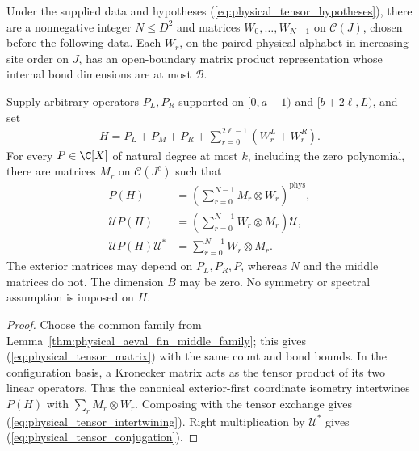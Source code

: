 \begin{lemma}
    \label{thm:physical_polynomial_tensor_family}
    \leanok
    Under the supplied data and hypotheses
    (\ref{eq:physical_tensor_hypotheses}), there are a nonnegative integer
    $N\le D^2$ and matrices
    $W_0,\ldots,W_{N-1}$ on $\mathcal C(J)$, chosen before the following data.
    Each $W_r$, on the paired physical alphabet in increasing site order on
    $J$, has an open-boundary matrix product representation whose internal
    bond dimensions are at most $\mathcal B$.

    Supply arbitrary operators $P_L,P_R$ supported on $\lbrack 0,a+1)$ and
    $\lbrack b+2\ell,L)$, and set
    \begin{align}
        H=P_L+P_M+P_R+\sum_{r=0}^{2\ell-1}(W^L_r+W^R_r).
        \label{eq:physical_tensor_hamiltonian}
    \end{align}
    For every $P\in\C[X]$ of natural degree at most $k$, including the zero
    polynomial, there are matrices $M_r$ on $\mathcal C(J^c)$ such that
    \begin{align}
        P(H)                        & =\left(\sum_{r=0}^{N-1}M_r\otimes W_r\right)^{\mathrm{phys}},
        \label{eq:physical_tensor_matrix}                                                           \\
        \mathcal U P(H)             & =\left(\sum_{r=0}^{N-1}W_r\otimes M_r\right)\mathcal U,
        \label{eq:physical_tensor_intertwining}                                                     \\
        \mathcal U P(H)\mathcal U^* & =\sum_{r=0}^{N-1}W_r\otimes M_r.
        \label{eq:physical_tensor_conjugation}
    \end{align}
    The exterior matrices may depend on $P_L,P_R,P$, whereas $N$ and the
    middle matrices do not. The dimension $B$ may be zero. No symmetry or
    spectral assumption is imposed on $H$.
\end{lemma}
\begin{proof}\leanok
    Choose the common family from
    Lemma~\ref{thm:physical_aeval_fin_middle_family}; this gives
    (\ref{eq:physical_tensor_matrix}) with the same count and bond bounds.
    In the configuration basis, a Kronecker matrix acts as the tensor product
    of its two linear operators. Thus the canonical exterior-first coordinate
    isometry intertwines $P(H)$ with $\sum_r M_r\otimes W_r$.
    Composing with the tensor exchange gives
    (\ref{eq:physical_tensor_intertwining}). Right multiplication by
    $\mathcal U^*$ gives (\ref{eq:physical_tensor_conjugation}).
\end{proof}
